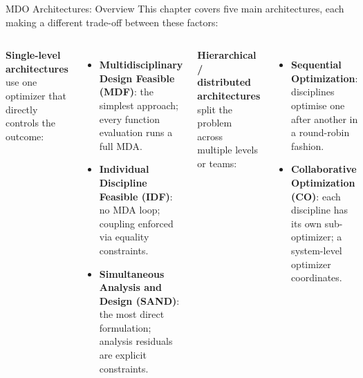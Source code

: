 \documentclass[aspectratio=169,10pt]{beamer}
\begin{document}
\begin{frame}[allowframebreaks]{MDO Architectures: Overview}
  This chapter covers five main architectures, each making a different
  trade-off between these factors:

  \begin{columns}[T]
    \textbf{Single-level architectures} use one optimizer that directly
    controls the outcome:
    \begin{itemize}
      \item \textbf{Multidisciplinary Design Feasible (MDF)}: the simplest
            approach; every function evaluation runs a full MDA.
      \item \textbf{Individual Discipline Feasible (IDF)}: no MDA loop;
            coupling enforced via equality constraints.
      \item \textbf{Simultaneous Analysis and Design (SAND)}: the most
            direct formulation; analysis residuals are explicit constraints.
    \end{itemize}

    \textbf{Hierarchical / distributed architectures} split the problem
    across multiple levels or teams:
    \begin{itemize}
      \item \textbf{Sequential Optimization}: disciplines optimise one
            after another in a round-robin fashion.
      \item \textbf{Collaborative Optimization (CO)}: each discipline has
            its own sub-optimizer; a system-level optimizer coordinates.
    \end{itemize}
  \end{columns}

\end{frame}
\end{document}
